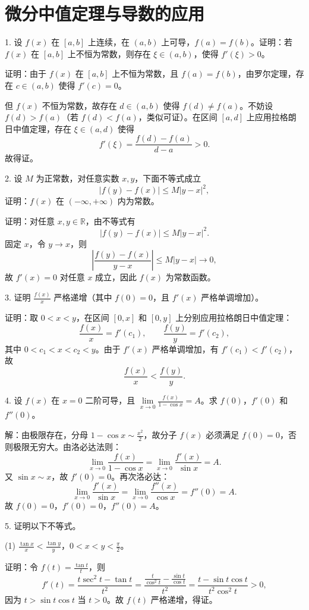 \section*{微分中值定理与导数的应用}

1. 设 \(f(x)\) 在 \([a,b]\) 上连续，在 \((a,b)\) 上可导，\(f(a)=f(b)\)。证明：若 \(f(x)\) 在 \([a,b]\) 上不恒为常数，则存在 \(\xi\in(a,b)\)，使得 \(f'(\xi)>0\)。

证明：由于 \(f(x)\) 在 \([a,b]\) 上不恒为常数，且 \(f(a)=f(b)\)，由罗尔定理，存在 \(c\in(a,b)\) 使得 \(f'(c)=0\)。

但 \(f(x)\) 不恒为常数，故存在 \(d\in(a,b)\) 使得 \(f(d)\neq f(a)\)。不妨设 \(f(d)>f(a)\)（若 \(f(d)<f(a)\)，类似可证）。在区间 \([a,d]\) 上应用拉格朗日中值定理，存在 \(\xi\in(a,d)\) 使得
\[ f'(\xi)=\frac{f(d)-f(a)}{d-a}>0. \]
故得证。

2. 设 \(M\) 为正常数，对任意实数 \(x,y\)，下面不等式成立
\[ |f(y)-f(x)|\le M|y-x|^{2}, \]
证明：\(f(x)\) 在 \((-\infty,+\infty)\) 内为常数。

证明：对任意 \(x,y\in\mathbb{R}\)，由不等式有
\[ |f(y)-f(x)|\le M|y-x|^{2}. \]
固定 \(x\)，令 \(y\to x\)，则
\[ \left|\frac{f(y)-f(x)}{y-x}\right|\le M|y-x|\to 0, \]
故 \(f'(x)=0\) 对任意 \(x\) 成立，因此 \(f(x)\) 为常数函数。

3. 证明 \(\frac{f(x)}{x}\) 严格递增（其中 \(f(0)=0\)，且 \(f'(x)\) 严格单调增加）。

证明：取 \(0<x<y\)，在区间 \([0,x]\) 和 \([0,y]\) 上分别应用拉格朗日中值定理：
\[ \frac{f(x)}{x}=f'(c_1),\qquad \frac{f(y)}{y}=f'(c_2), \]
其中 \(0<c_1<x<c_2<y\)。由于 \(f'(x)\) 严格单调增加，有 \(f'(c_1)<f'(c_2)\)，故
\[ \frac{f(x)}{x}<\frac{f(y)}{y}. \]

4. 设 \(f(x)\) 在 \(x=0\) 二阶可导，且 \(\lim\limits_{x\to 0}\frac{f(x)}{1-\cos x}=A\)。求 \(f(0)\)，\(f'(0)\) 和 \(f''(0)\)。

解：由极限存在，分母 \(1-\cos x\sim\frac{x^{2}}{2}\)，故分子 \(f(x)\) 必须满足 \(f(0)=0\)，否则极限无穷大。由洛必达法则：
\[ \lim_{x\to 0}\frac{f(x)}{1-\cos x}=\lim_{x\to 0}\frac{f'(x)}{\sin x}=A. \]
又 \(\sin x\sim x\)，故 \(f'(0)=0\)。再次洛必达：
\[ \lim_{x\to 0}\frac{f'(x)}{\sin x}=\lim_{x\to 0}\frac{f''(x)}{\cos x}=f''(0)=A. \]
故 \(f(0)=0\)，\(f'(0)=0\)，\(f''(0)=A\)。

5. 证明以下不等式。

(1) \(\frac{\tan x}{x}<\frac{\tan y}{y}\)，\(0<x<y<\frac{\pi}{2}\)。

证明：令 \(f(t)=\frac{\tan t}{t}\)，则
\[ f'(t)=\frac{t\sec^{2}t-\tan t}{t^{2}}=\frac{\frac{t}{\cos^{2}t}-\frac{\sin t}{\cos t}}{t^{2}}=\frac{t-\sin t\cos t}{t^{2}\cos^{2}t}>0, \]
因为 \(t>\sin t\cos t\) 当 \(t>0\)。故 \(f(t)\) 严格递增，得证。

